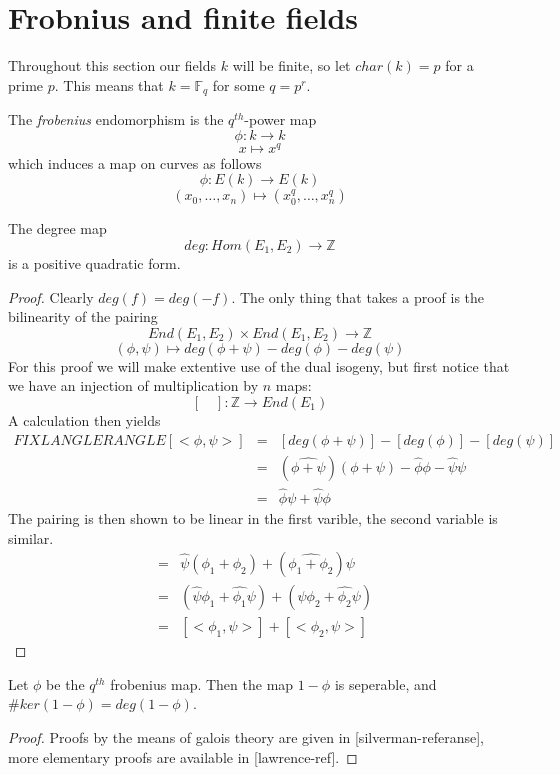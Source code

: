 \section{Frobnius and finite fields}
Throughout this section our fields $k$ will be finite, so let $char(k) = p$ for
a prime $p$. This means that $k = \mathbb{F}_{q}$ for some $q = p^r$.

\begin{mydef}
 The \emph{frobenius} endomorphism is the $q^{th}$-power map
$$ \phi: k \rightarrow k $$
$$ x \mapsto x^q $$
which induces a map on curves as follows
$$ \phi: E(k) \rightarrow E(k) $$
$$ (x_0,\ldots , x_n) \mapsto (x_0^q, \ldots , x_n^q) $$
\end{mydef}

\begin{prop}
 The degree map
$$ deg: Hom(E_1, E_2) \rightarrow \mathbb{Z} $$
is a positive quadratic form.
\end{prop}
\begin{proof}
 Clearly $deg(f) = deg(-f)$. The only thing that takes a proof is the
bilinearity of the pairing
$$ End(E_1, E_2) \times End(E_1, E_2) \rightarrow \mathbb{Z}$$
$$ (\phi, \psi) \mapsto deg(\phi + \psi) - deg(\phi) - deg(\psi) $$
For this proof we will make extentive use of the dual isogeny, but first
notice that we have an injection of multiplication by $n$ maps:
$$ [\quad]: \mathbb{Z} \rightarrow End(E_1) $$
A calculation then yields 
\begin{eqnarray*} 
FIX LANGLE RANGLE
 [<\phi,\psi>] &=& [deg(\phi+\psi)]-[deg(\phi)]-[deg(\psi)] \nonumber \\
               &=& (\hat{\phi+\psi})(\phi+\psi) - \hat{\phi}\phi - \hat{\psi}\psi \nonumber \\
	       &=& \hat{\phi}\psi + \hat{\psi}\phi
\end{eqnarray*}
The pairing is then shown to be linear in the first varible, the second variable is
similar.
\begin{eqnarray*}
 [<\phi_1+\phi_2, \psi>] &=& \hat{\psi}(\phi_1+\phi_2) + (\hat{\phi_1+\phi_2})\psi \nonumber \\
			 &=& (\hat{\psi}\phi_1+\hat{\phi_1}\psi) + (\hat{\psi}\phi_2 + \hat{\phi_2}\psi) \nonumber \\
			 &=& [<\phi_1,\psi>] + [<\phi_2,\psi>] 
\end{eqnarray*}
\end{proof}

\begin{thm}
 Let $\phi$ be the $q^{th}$ frobenius map. Then the map $1-\phi$ is seperable, and
$\#ker(1-\phi) = deg(1-\phi)$.
\end{thm}
\begin{proof}
 Proofs by the means of galois theory are given in [silverman-referanse], more
elementary proofs are available in [lawrence-ref].
\end{proof}

